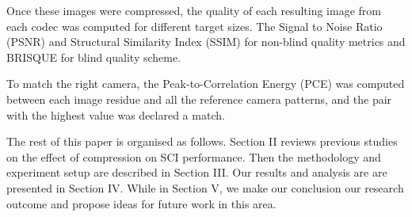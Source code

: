 \documentclass[conference]{IEEEtran}
\begin{document}
Once these images were compressed, the quality of each resulting image from each codec was computed for different target sizes. The Signal to Noise Ratio (PSNR) and Structural Similarity Index (SSIM) for non-blind quality metrics and BRISQUE for blind quality scheme.

To match the right camera, the Peak-to-Correlation Energy (PCE) was computed between each image residue and all the reference camera patterns, and the pair with the highest value was declared a match.

The rest of this paper is organised as follows. Section II reviews previous studies on the effect of compression on SCI performance. Then the methodology and experiment setup are described in Section III. Our results and analysis are are presented in Section IV. While in Section V, we make our conclusion our research outcome and propose ideas for future work in this area.
\end{document}
